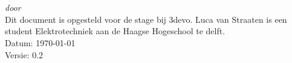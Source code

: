 \begin{titlepage}
    \vspace*{5cm}
    \makeatletter
    \begin{center}
        \begin{Huge}
            \@title
        \end{Huge}\\[0.1cm]
        \begin{Large}
            \@subtitle
        \end{Large}\\
        \emph{door}\\
        \@author
        \vfill
        Dit document is opgesteld voor de stage bij 3devo. Luca van
        Straaten is een student Elektrotechniek aan de Haagse Hogeschool te
        delft.\\
        \vspace{.5cm}
        Datum: \today\\
        Versie: 0.2
    \end{center}
    \makeatother
\end{titlepage}

\newpage
